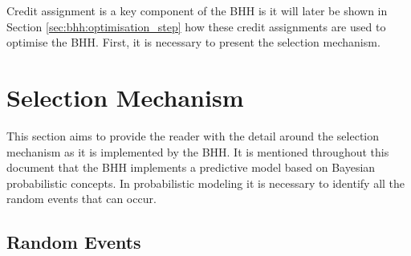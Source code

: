 \begin{table}[htbp]
      \centering
      \caption{Credit assignment strategy output table showing \textit{ibest} credit assignment for the first 5 entity's and their selected heuristics for step 1 of the training process.}
      \label{tab:bhh:credit_assignment_strategy:credit_assignment_example}%
      \par\bigskip
\end{table}%

Credit assignment is a key component of the \ac{BHH} is it will later be shown in Section \ref{sec:bhh:optimisation_step} how these credit assignments are used to optimise the \ac{BHH}. First, it is necessary to present the selection mechanism.


\section{Selection Mechanism}
\label{sec:bhh:selection_mechanism}

This section aims to provide the reader with the detail around the selection mechanism as it is implemented by the \ac{BHH}. It is mentioned throughout this document that the \ac{BHH} implements a predictive model based on Bayesian probabilistic concepts. In probabilistic modeling it is necessary to identify all the random events that can occur.

\subsection{Random Events}
\label{sec:bhh:selection_mechanism:random_events}

